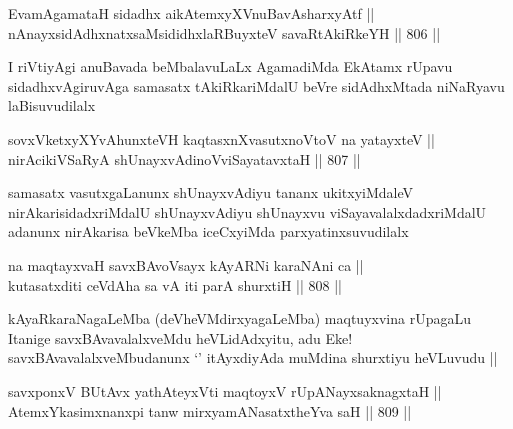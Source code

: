 
\begin{shl}
EvamAgamataH sidadhx aikAtemxyXV\s nuBavAsharxyAtf ||  \\
nAnayxsidAdhxnatxsaMsididhxlaRBuyxteV savaRtAkiRkeYH ||  806 ||  
\end{shl}

\begin{artha}
I riVtiyAgi anuBavada beMbalavuLaLx AgamadiMda EkAtamx rUpavu sidadhxvAgiruvAga samasatx tAkiRkariMdalU beVre sidAdhxMtada niNaRyavu laBisuvudilalx
\end{artha}


\begin{shl}
sovxVketxyXYvAhunxteVH kaqtasxnXvasutxnoV\s toV na yatayxteV || \\
nirAcikiVSaRyA shUnayxvAdinoV\s viSayatavxtaH ||  807 ||  
\end{shl}

\begin{artha}
samasatx vasutxgaLanunx shUnayxvAdiyu tananx ukitxyiMdaleV nirAkarisidadxriMdalU shUnayxvAdiyu shUnayxvu viSayavalalxdadxriMdalU adanunx nirAkarisa beVkeMba iceCxyiMda parxyatinxsuvudilalx
\end{artha}


\begin{shl}
na maqtayxvaH savxBAvoV\s sayx kAyARNi karaNAni ca ||  \\
kutasatxditi ceVdAha sa vA iti parA shurxtiH ||  808 ||  
\end{shl}

\begin{artha}
kAyaRkaraNagaLeMba (deVheVMdirxyagaLeMba) maqtuyxvina rUpagaLu Itanige savxBAvavalalxveMdu heVLidAdxyitu, adu Eke! savxBAvavalalxveMbudanunx `\stext' itAyxdiyAda muMdina shurxtiyu heVLuvudu ||
\end{artha}


\begin{shl}
savxponxV BUtAvx yathA\s teyxVti maqtoyxV rUpANayxsaknagxtaH || \\
AtemxYkasimxnanxpi tanw mirxyamANasatxtheYva saH ||  809 ||  
\end{shl}

